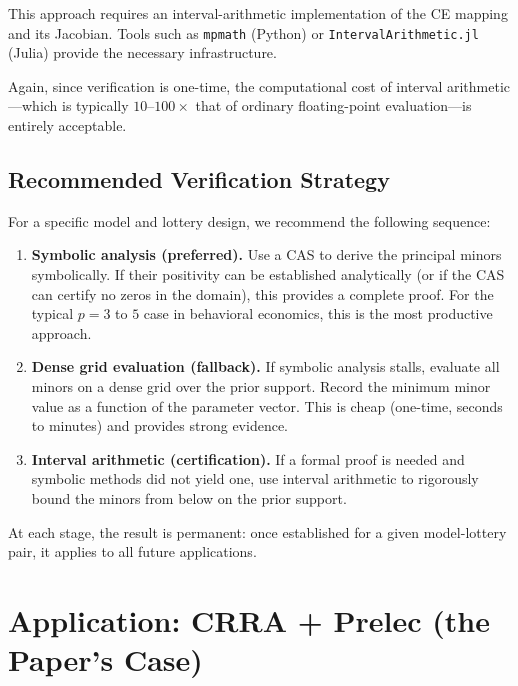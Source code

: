 \documentclass[11pt,a4paper]{article}
\theoremstyle{definition}
\begin{document}
This approach requires an interval-arithmetic implementation of the CE
mapping and its Jacobian. Tools such as \texttt{mpmath} (Python) or
\texttt{IntervalArithmetic.jl} (Julia) provide the necessary infrastructure.

Again, since verification is one-time, the computational cost of interval
arithmetic---which is typically $10$--$100\times$ that of ordinary
floating-point evaluation---is entirely acceptable.

\subsection{Recommended Verification Strategy}

For a specific model and lottery design, we recommend the following sequence:

\begin{enumerate}
    \item \textbf{Symbolic analysis (preferred).} Use a CAS to derive the
    principal minors symbolically. If their positivity can be established
    analytically (or if the CAS can certify no zeros in the domain), this
    provides a complete proof. For the typical $p = 3$ to $5$ case in
    behavioral economics, this is the most productive approach.

    \item \textbf{Dense grid evaluation (fallback).} If symbolic analysis
    stalls, evaluate all minors on a dense grid over the prior support.
    Record the minimum minor value as a function of the parameter vector.
    This is cheap (one-time, seconds to minutes) and provides strong
    evidence.

    \item \textbf{Interval arithmetic (certification).} If a formal proof is
    needed and symbolic methods did not yield one, use interval arithmetic to
    rigorously bound the minors from below on the prior support.
\end{enumerate}

At each stage, the result is permanent: once established for a given
model-lottery pair, it applies to all future applications.


\section{Application: CRRA + Prelec (the Paper's Case)}
\label{sec:application}
\end{document}
